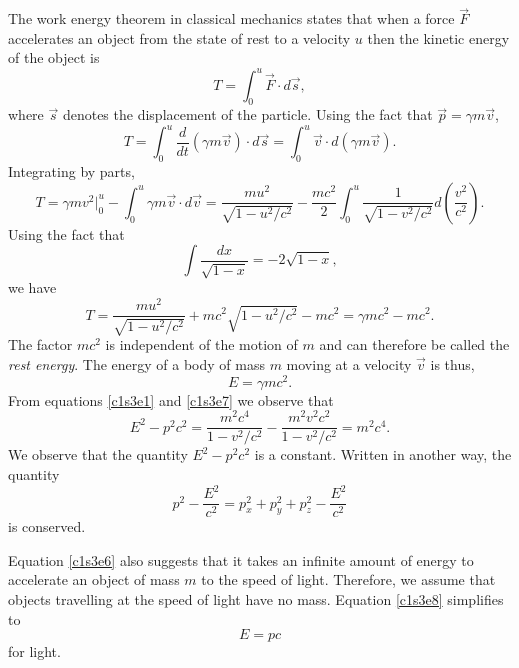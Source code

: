 The work energy theorem in classical mechanics states that when a force 
$\vec{F}$ accelerates an object from the state of rest to a velocity $u$ then
the kinetic energy of the object is
\begin{equation}\label{c1s3e5}
T = \int_0^u \vec{F}\cdot d\vec{s},
\end{equation}
where $\vec{s}$ denotes the displacement of the particle. Using the fact that
$\vec{p} = \gamma m\vec{v}$,
\[
T = \int_0^u \frac{d}{dt}(\gamma m\vec{v})\cdot d\vec{s} = 
\int_0^u \vec{v}\cdot d(\gamma m\vec{v}).
\]
Integrating by parts,
\[
T = \gamma mv^2\Big|_0^u - \int_0^u \gamma m\vec{v}\cdot d\vec{v} =
\frac{mu^2}{\sqrt{1 - u^2/c^2}} - \frac{mc^2}{2}\int_0^u 
\frac{1}{\sqrt{1 - v^2/c^2}}d\left(\frac{v^2}{c^2}\right).
\]
Using the fact that
\[
\int\frac{dx}{\sqrt{1 - x}} = -2\sqrt{1 - x},
\]
we have
\begin{equation}\label{c1s3e6}
T = \frac{mu^2}{\sqrt{1 - u^2/c^2}} + mc^2\sqrt{1 - u^2/c^2} - mc^2
= \gamma mc^2 - mc^2.
\end{equation}
The factor $mc^2$ is independent of the motion of $m$ and can therefore be
called the \emph{rest energy}. The energy of a body of mass $m$ moving at a 
velocity $\vec{v}$ is thus,
\begin{equation}\label{c1s3e7}
E = \gamma mc^2.
\end{equation}
From equations \eqref{c1s3e1} and \eqref{c1s3e7} we observe that
\begin{equation}\label{c1s3e8}
E^2 - p^2c^2 = \frac{m^2c^4}{1 - v^2/c^2} - \frac{m^2v^2c^2}{1 - v^2/c^2} = 
m^2c^4.
\end{equation}
We observe that the quantity $E^2 - p^2c^2$ is a constant. Written in another 
way, the quantity
\begin{equation}\label{c1s3e9}
p^2 - \frac{E^2}{c^2} = p_x^2 + p_y^2 + p_z^2 - \frac{E^2}{c^2}
\end{equation}
is conserved.

Equation \eqref{c1s3e6} also suggests that it takes an infinite amount of
energy to accelerate an object of mass $m$ to the speed of light. Therefore,
we assume that objects travelling at the speed of light have no mass. Equation 
\eqref{c1s3e8} simplifies to 
\begin{equation}\label{c1s3e10}
E = pc
\end{equation}
for light.

